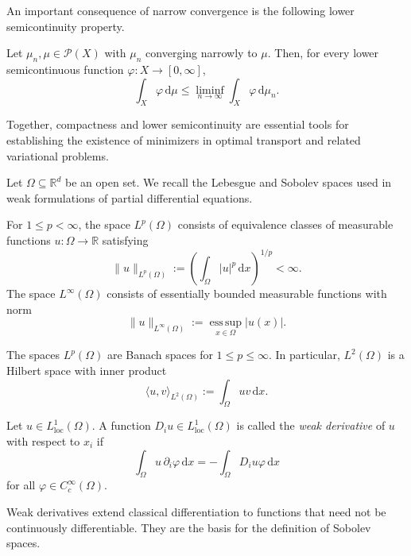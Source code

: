 An important consequence of narrow convergence
is the following lower semicontinuity property.
\begin{theorem}
    Let $\mu_n,\mu\in\mathcal{P}(X)$ with
    $\mu_n$ converging narrowly to $\mu$.
    Then, for every lower semicontinuous
    function $\varphi:X\to[0,\infty]$,
    \[
        \int_X\varphi\,\mathrm{d}\mu
        \leq
        \liminf_{n\to\infty}
        \int_X\varphi\,\mathrm{d}\mu_n.
    \]
\end{theorem}

Together, compactness and lower semicontinuity
are essential tools for establishing the
existence of minimizers in optimal transport
and related variational problems.

Let $\Omega\subseteq\mathbb{R}^d$ be an open
set. We recall the Lebesgue and Sobolev
spaces used in weak formulations of partial
differential equations.

\begin{definition}[$L^p$ Spaces]
    For $1\leq p<\infty$, the space
    $L^p(\Omega)$ consists of equivalence
    classes of measurable functions
    $u:\Omega\to\mathbb{R}$ satisfying
    \[
        \|u\|_{L^p(\Omega)}
        :=\left(\int_\Omega |u|^p
        \,\mathrm{d}x\right)^{1/p}<\infty.
    \]
    The space $L^\infty(\Omega)$ consists
    of essentially bounded measurable
    functions with norm
    \[
        \|u\|_{L^\infty(\Omega)}
        :=\operatorname*{ess\,sup}_{x\in\Omega}
        |u(x)|.
    \]
\end{definition}

The spaces $L^p(\Omega)$ are Banach spaces
for $1\leq p\leq\infty$. In particular,
$L^2(\Omega)$ is a Hilbert space with
inner product
\[
    \langle u,v\rangle_{L^2(\Omega)}
    :=\int_\Omega uv\,\mathrm{d}x.
\]
\begin{definition}
    Let $u\in L^1_{\mathrm{loc}}(\Omega)$.
    A function $D_i u\in L^1_{\mathrm{loc}}(\Omega)$
    is called the \emph{weak derivative}
    of $u$ with respect to $x_i$ if
    \[
        \int_\Omega u\,\partial_i\varphi
        \,\mathrm{d}x
        =
        -\int_\Omega D_i u\varphi
        \,\mathrm{d}x
    \]
    for all $\varphi\in C_c^\infty(\Omega)$.
\end{definition}

Weak derivatives extend classical
differentiation to functions that need not
be continuously differentiable. They are
the basis for the definition of Sobolev spaces.

